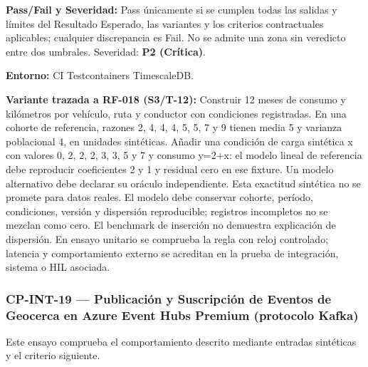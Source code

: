 \par\noindent\textbf{Pass/Fail y Severidad:} Pass únicamente si se cumplen todas las salidas y límites del Resultado Esperado, las variantes y los criterios contractuales aplicables; cualquier discrepancia es Fail. No se admite una zona sin veredicto entre dos umbrales. Severidad: \textbf{P2 (Crítica)}.\par
\par\noindent\textbf{Entorno:} CI Testcontainers TimescaleDB.\par







\par\noindent\textbf{Variante trazada a RF-018 (S3/T-12):} Construir 12 meses de consumo y kilómetros por vehículo, ruta y conductor con condiciones registradas. En una cohorte de referencia, razones 2, 4, 4, 4, 5, 5, 7 y 9 tienen media 5 y varianza poblacional 4, en unidades sintéticas. Añadir una condición de carga sintética x con valores 0, 2, 2, 2, 3, 3, 5 y 7 y consumo y=2+x: el modelo lineal de referencia debe reproducir coeficientes 2 y 1 y residual cero en ese fixture. Un modelo alternativo debe declarar su oráculo independiente. Esta exactitud sintética no se promete para datos reales. El modelo debe conservar cohorte, período, condiciones, versión y dispersión reproducible; registros incompletos no se mezclan como cero. El benchmark de inserción no demuestra explicación de dispersión. En ensayo unitario se comprueba la regla con reloj controlado; latencia y comportamiento externo se acreditan en la prueba de integración, sistema o HIL asociada.\par
\subsubsection*{CP-INT-19 — Publicación y Suscripción de Eventos de Geocerca en Azure Event Hubs Premium (protocolo Kafka)}\label{sec:9-cp-int-19}
Este ensayo comprueba el comportamiento descrito mediante entradas sintéticas y el criterio siguiente.

